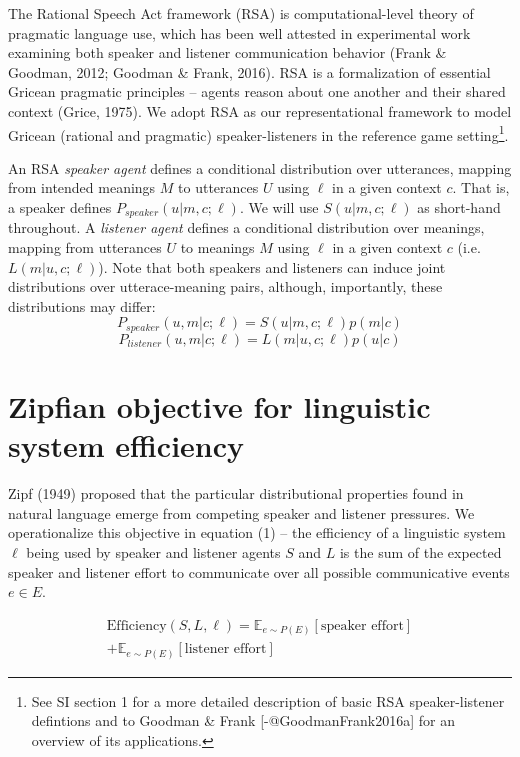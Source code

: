 \documentclass[10pt, letterpaper]{article}
\begin{document}
The Rational Speech Act framework (RSA) is computational-level theory of
pragmatic language use, which has been well attested in experimental
work examining both speaker and listener communication behavior (Frank
\& Goodman, 2012; Goodman \& Frank, 2016). RSA is a formalization of
essential Gricean pragmatic principles -- agents reason about one
another and their shared context (Grice, 1975). We adopt RSA as our
representational framework to model Gricean (rational and pragmatic)
speaker-listeners in the reference game
setting\footnote{See SI section 1 for a more detailed description of basic RSA speaker-listener defintions and to Goodman \& Frank [-@GoodmanFrank2016a] for an overview of its applications.}.\par

An RSA \emph{speaker agent} defines a conditional distribution over
utterances, mapping from intended meanings \(M\) to utterances \(U\)
using \(\ell\) in a given context \(c\). That is, a speaker defines
\(P_{speaker}(u|m, c; \ell)\). We will use \(S(u|m, c; \ell)\) as
short-hand throughout. A \emph{listener agent} defines a conditional
distribution over meanings, mapping from utterances \(U\) to meanings
\(M\) using \(\ell\) in a given context \(c\) (i.e. \(L(m|u, c;\ell)\)).
Note that both speakers and listeners can induce joint distributions
over utterace-meaning pairs, although, importantly, these distributions
may differ: \[P_{speaker}(u, m | c; \ell) = S(u|m, c; \ell)p(m|c)\]
\[P_{listener}(u, m| c; \ell) = L(m|u, c; \ell)p(u|c)\]

\section{Zipfian objective for linguistic system
efficiency}\label{zipfian-objective-for-linguistic-system-efficiency}

Zipf (1949) proposed that the particular distributional properties found
in natural language emerge from competing speaker and listener
pressures. We operationalize this objective in equation (1) -- the
efficiency of a linguistic system \(\ell\) being used by speaker and
listener agents \(S\) and \(L\) is the sum of the expected speaker and
listener effort to communicate over all possible communicative events
\(e \in E\).\par

\begin{equation}
\begin{split}
  \text{Efficiency}(S, L, \ell) = \mathbb{E}_{e \sim P(E)}[\text{speaker effort}] \\+ \mathbb{E}_{e \sim P(E)}[\text{listener effort}]
\end{split}
\end{equation}
\end{document}

